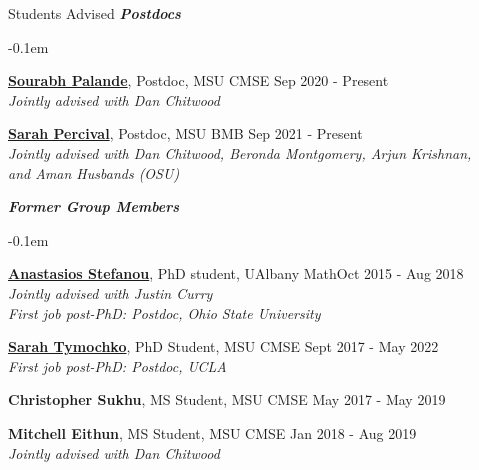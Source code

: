 \documentclass{resume} %
\begin{document}
\begin{rSection}{Students Advised}
\textbf{\textit{Postdocs}}
\begin{list}{}{\leftmargin=1em}
   \itemsep -0.1em %


   \item \textbf{\href{http://sci.utah.edu/~sourabh/}{Sourabh Palande}}, Postdoc, MSU CMSE \hfill Sep 2020 - Present\\
   \phantom{XXX} \textit{Jointly advised with Dan Chitwood}

   \item \textbf{\href{https://sperciva.github.io/}{Sarah Percival}}, Postdoc, MSU BMB \hfill Sep 2021 - Present\\
   \phantom{XXX} \textit{Jointly advised with Dan Chitwood, Beronda Montgomery, Arjun Krishnan,}\\
   \phantom{XXX} \textit{and Aman Husbands (OSU)}


\end{list}

\textbf{\textit{Former Group Members}}
\begin{list}{}{\leftmargin=1em}
   \itemsep -0.1em %


   \item \textbf{\href{https://sites.google.com/view/anastasiostefanou/home}{Anastasios Stefanou}}, PhD student, UAlbany Math\hfill Oct 2015 - Aug 2018
\\
   \phantom{XXX} \textit{Jointly advised with Justin Curry}
\\
   \phantom{XXX} \textit{First job post-PhD: Postdoc, Ohio State University}


   \item \textbf{\href{https://www.sarahtymochko.com/}{Sarah Tymochko}}, PhD Student, MSU CMSE \hfill Sept 2017 - May 2022
\\
   \phantom{XXX} \textit{First job post-PhD: Postdoc, UCLA}


   \item \textbf{Christopher Sukhu}, MS Student, MSU CMSE \hfill May 2017 - May 2019

   \item \textbf{Mitchell Eithun}, MS Student, MSU CMSE \hfill Jan 2018 - Aug 2019
\\
   \phantom{XXX} \textit{Jointly advised with Dan Chitwood}





\end{list}
\end{rSection}
\end{document}

